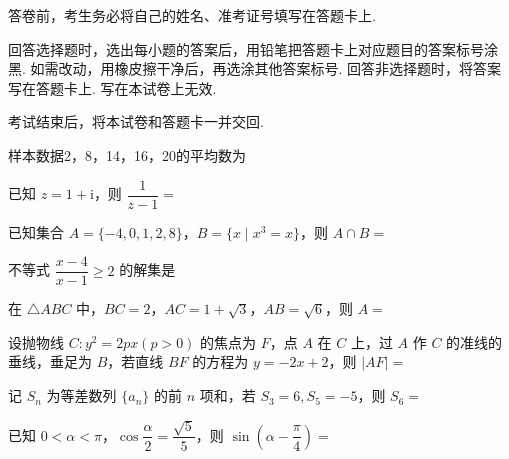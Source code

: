 \documentclass[a4paper,11pt]{report}
\begin{document}
\examfontsize



\noticetitle
\begin{examnotice}
\item 答卷前，考生务必将自己的姓名、准考证号填写在答题卡上. 
\item 回答选择题时，选出每小题的答案后，用铅笔把答题卡上对应题目的答案标号涂黑. 如需改动，用橡皮擦干净后，再选涂其他答案标号. 回答非选择题时，将答案写在答题卡上. 写在本试卷上无效. 
\item 考试结束后，将本试卷和答题卡一并交回. 
\end{examnotice}

\begin{examquestions}
\item 样本数据2，8，14，16，20的平均数为
\item 已知 $z=1+\mathrm{i}$，则 $\dfrac1{z-1}=$
\item 已知集合 $A=\{-4,0,1,2,8\}$，$B=\{x\mid x^3=x\}$，则 $A\cap B=$
\item 不等式 $\dfrac{x-4}{x-1}\geq2$ 的解集是
\item 在 $\triangle ABC$ 中，$BC=2$，$AC=1+\sqrt3$，$AB=\sqrt6$，则 $A=$
\item 设抛物线 $C:y^2=2px(p>0)$ 的焦点为 $F$，点 $A$ 在 $C$ 上，过 $A$ 作 $C$ 的准线的垂线，垂足为 $B$，若直线 $BF$ 的方程为 $y=-2x+2$，则 $|AF|=$
\item 记 $S_n$ 为等差数列 $\{a_n\}$ 的前 $n$ 项和，若 $S_3=6,S_5=-5$，则 $S_6=$
\item 已知 $0<\alpha<\pi$，$\cos\dfrac\alpha2=\dfrac{\sqrt5}{5}$，则 $\sin\left(\alpha-\dfrac\pi4\right)=$
\end{examquestions}
\end{document}
